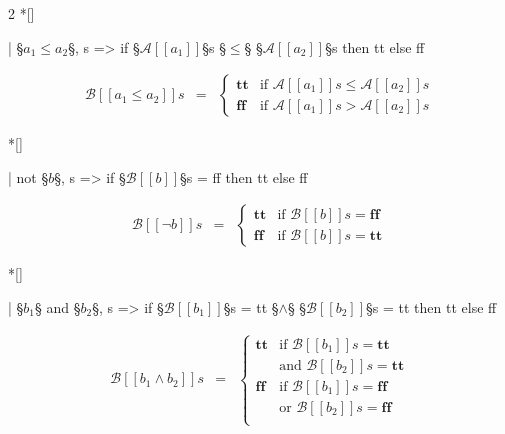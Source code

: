 \begin{paracol}{2}
\switchcolumn[1]*[]
\begin{leftcolumn}
    \begin{Lean_Code}
  | §\(a_1 \leq a_2\)§, s =>
    if  §\(\mathcal{A}[\![a_1]\!]\)§s §\(\leq\)§ §\(\mathcal{A}[\![a_2]\!]\)§s then tt
    else ff
    \end{Lean_Code}
\end{leftcolumn}
\newpage
\begin{rightcolumn}
    \[
    \begin{array}{rcl}
    \mathcal{B}[\![a_1 \leq a_2]\!]s &=& \begin{cases} 
        \textbf{tt} & \text{if } \mathcal{A}[\![a_1]\!]s \leq \mathcal{A}[\![a_2]\!]s  \\ 
        \textbf{ff} & \text{if } \mathcal{A}[\![a_1]\!]s > \mathcal{A}[\![a_2]\!]s 
        \end{cases}
    \end{array}
    \]
\end{rightcolumn}

\switchcolumn[1]*[]
\begin{leftcolumn}
    \begin{Lean_Code}
  | not §\(b\)§, s =>
    if  §\(\mathcal{B}[\![b]\!]\)§s = ff then tt
    else ff
    \end{Lean_Code}
\end{leftcolumn}
\begin{rightcolumn}
    \[
    \begin{array}{rcl}
    \mathcal{B}[\![\neg b]\!]s &=& \begin{cases} 
        \textbf{tt} & \text{if } \mathcal{B}[\![b]\!]s = \textbf{ff} \\ 
        \textbf{ff} & \text{if } \mathcal{B}[\![b]\!]s = \textbf{tt}
        \end{cases}
    \end{array}
    \]
\end{rightcolumn}

\switchcolumn[1]*[]
\begin{leftcolumn}
    \begin{Lean_Code}
  | §\(b_1\)§ and §\(b_2\)§, s =>
    if 
      §\(\mathcal{B}[\![b_1]\!]\)§s = tt §\(\land\)§ §\(\mathcal{B}[\![b_2]\!]\)§s = tt
    then tt
    else ff
    \end{Lean_Code}
\end{leftcolumn}
\begin{rightcolumn}
    \[
    \begin{array}{rcl}
    \mathcal{B}[\![b_1 \land b_2]\!]s &=& \begin{cases} 
        \textbf{tt} & \text{if } \mathcal{B}[\![b_1]\!]s = \textbf{tt} \\ & \text{and } \mathcal{B}[\![b_2]\!]s = \textbf{tt} \\ 
        \textbf{ff} & \text{if } \mathcal{B}[\![b_1]\!]s = \textbf{ff} \\ & \text{or } \mathcal{B}[\![b_2]\!]s = \textbf{ff} \\ 
        \end{cases}
    \end{array}
    \]
\end{rightcolumn}
\end{paracol}
